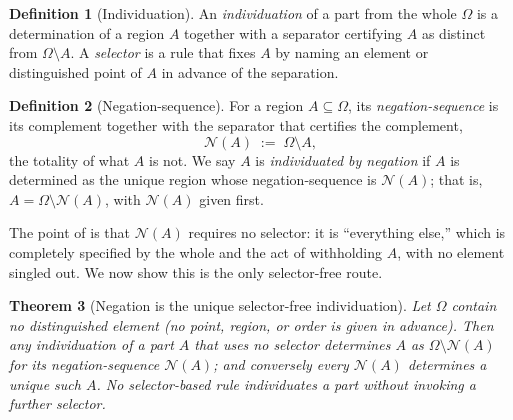 \documentclass[11pt,twocolumn,a4paper]{article}
\theoremstyle{thmstyle}
\newtheorem{theorem}{Theorem}[section]
\theoremstyle{definition}
\newtheorem{definition}[theorem]{Definition}
\theoremstyle{remark}
\newcommand{\Space}{\Omega}
\newcommand{\Neg}{\mathcal{N}}
\begin{document}
\begin{definition}[Individuation]
\label{def:individuation}
An \emph{individuation} of a part from the whole $\Space$ is a determination of a
region $A$ together with a separator certifying $A$ as distinct from
$\Space\setminus A$. A \emph{selector} is a rule that fixes $A$ by naming an
element or distinguished point of $A$ in advance of the separation.
\end{definition}

\begin{definition}[Negation-sequence]
\label{def:negation}
For a region $A\subseteq\Space$, its \emph{negation-sequence} is its complement
together with the separator that certifies the complement,
\[
\Neg(A)\;:=\;\Space\setminus A,
\]
the totality of what $A$ is not. We say $A$ is \emph{individuated by negation}
if $A$ is determined as the unique region whose negation-sequence is $\Neg(A)$;
that is, $A=\Space\setminus\Neg(A)$, with $\Neg(A)$ given first.
\end{definition}

The point of  is that $\Neg(A)$ requires no selector: it is
``everything else,'' which is completely specified by the whole and the act of
withholding $A$, with no element singled out. We now show this is the only
selector-free route.

\begin{theorem}[Negation is the unique selector-free individuation]
\label{thm:negation-unique}
Let $\Space$ contain no distinguished element \textup{(}no point, region, or
order is given in advance\textup{)}. Then any individuation of a part $A$ that
uses no selector determines $A$ as $\Space\setminus\Neg(A)$ for its
negation-sequence $\Neg(A)$; and conversely every $\Neg(A)$ determines a unique
such $A$. No selector-based rule individuates a part without invoking a further
selector.
\end{theorem}
\end{document}

